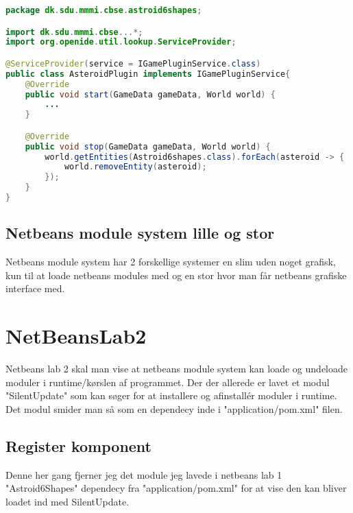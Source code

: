 \begin{lstlisting}[caption={AsteroidPlugin.java}, label={lst:AsteroidPlugin}, language=java]
package dk.sdu.mmmi.cbse.astroid6shapes;

import dk.sdu.mmmi.cbse...*;
import org.openide.util.lookup.ServiceProvider;

@ServiceProvider(service = IGamePluginService.class)
public class AsteroidPlugin implements IGamePluginService{
	@Override
    public void start(GameData gameData, World world) {
        ...
    }

    @Override
    public void stop(GameData gameData, World world) {
		world.getEntities(Astroid6shapes.class).forEach(asteroid -> {
			world.removeEntity(asteroid);
		});
    }
}
\end{lstlisting}

\subsection{Netbeans module system lille og stor}
Netbeans module system har 2 forskellige systemer en slim uden noget grafisk,
kun til at loade netbeans modules med og en stor hvor man får netbeans grafiske
interface med.



\newpage
\section{NetBeansLab2}
Netbeans lab 2 skal man vise at netbeans module system kan loade og undeloade
moduler i runtime/kørslen af programmet. Der der allerede er lavet et modul
"SilentUpdate" som kan søger for at installere og afinstallér moduler i
runtime. Det modul smider man så som en dependecy inde i "application/pom.xml"
filen.

\subsection{Register komponent}
Denne her gang fjerner jeg det module jeg lavede i netbeans lab 1
"Astroid6Shapes" dependecy fra "application/pom.xml" for at vise den kan bliver
loadet ind med SilentUpdate.


\hfill \linebreak \hline 
{}
\hline \hfill \linebreak

